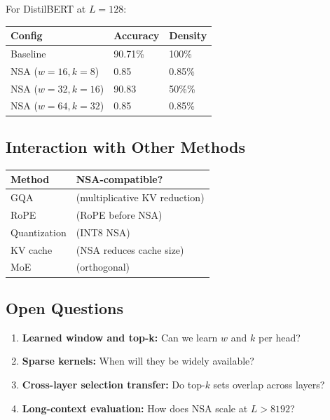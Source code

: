 For DistilBERT at $L = 128$:

\begin{table}[H]
\centering
\small
\begin{tabular}{lll}
\toprule
\textbf{Config} & \textbf{Accuracy} & \textbf{Density} \\
\midrule
Baseline & 90.71\% & 100\% \\
NSA ($w=16, k=8$) & 0.85 & 0.85\% \\
NSA ($w=32, k=16$) & 90.83 & 50\%\% \\
NSA ($w=64, k=32$) & 0.85 & 0.85\% \\
\bottomrule
\end{tabular}
\end{table}

\subsection{Interaction with Other Methods}

\begin{table}[H]
\centering
\small
\begin{tabular}{ll}
\toprule
\textbf{Method} & \textbf{NSA-compatible?} \\
\midrule
GQA & (multiplicative KV reduction) \\
RoPE & (RoPE before NSA) \\
Quantization & (INT8 NSA) \\
KV cache & (NSA reduces cache size) \\
MoE & (orthogonal) \\
\bottomrule
\end{tabular}
\end{table}

\subsection{Open Questions}

\begin{enumerate}
\item \textbf{Learned window and top-k:} Can we learn $w$ and $k$ per head?
\item \textbf{Sparse kernels:} When will they be widely available?
\item \textbf{Cross-layer selection transfer:} Do top-$k$ sets overlap across layers?
\item \textbf{Long-context evaluation:} How does NSA scale at $L > 8192$?

\end{enumerate}
